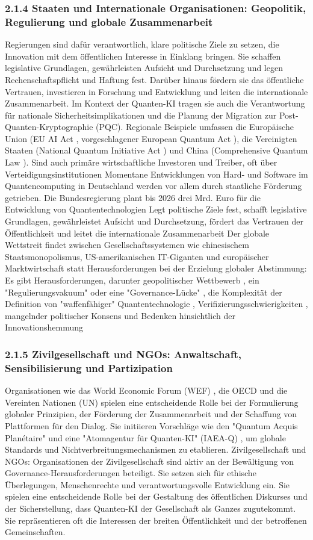 \subsubsection{2.1.4 Staaten und Internationale Organisationen: Geopolitik, Regulierung und globale Zusammenarbeit}
 Regierungen sind dafür verantwortlich, klare politische Ziele zu setzen, die Innovation mit dem öffentlichen Interesse in Einklang bringen. Sie schaffen legislative Grundlagen, gewährleisten Aufsicht und Durchsetzung und legen Rechenschaftspflicht und Haftung fest. Darüber hinaus fördern sie das öffentliche Vertrauen, investieren in Forschung und Entwicklung und leiten die internationale Zusammenarbeit. Im Kontext der Quanten-KI tragen sie auch die Verantwortung für nationale Sicherheitsimplikationen und die Planung der Migration zur Post-Quanten-Kryptographie (PQC). Regionale Beispiele umfassen die Europäische Union (EU AI Act , vorgeschlagener European Quantum Act ), die Vereinigten Staaten (National Quantum Initiative Act ) und China (Comprehensive Quantum Law ). 
Sind auch primäre wirtschaftliche Investoren und Treiber, oft über Verteidigungsinstitutionen
Momentane Entwicklungen von Hard- und Software im Quantencomputing in Deutschland werden vor allem durch staatliche Förderung getrieben. Die Bundesregierung plant bis 2026 drei Mrd. Euro für die Entwicklung von Quantentechnologien
Legt politische Ziele fest, schafft legislative Grundlagen, gewährleistet Aufsicht und Durchsetzung, fördert das Vertrauen der Öffentlichkeit und leitet die internationale Zusammenarbeit
Der globale Wettstreit findet zwischen Gesellschaftssystemen wie chinesischem Staatsmonopolismus, US-amerikanischen IT-Giganten und europäischer Marktwirtschaft statt
Herausforderungen bei der Erzielung globaler Abstimmung: Es gibt Herausforderungen, darunter geopolitischer Wettbewerb , ein "Regulierungsvakuum" oder eine "Governance-Lücke" , die Komplexität der Definition von "waffenfähiger" Quantentechnologie , Verifizierungsschwierigkeiten , mangelnder politischer Konsens und Bedenken hinsichtlich der Innovationshemmung

\subsubsection{2.1.5 Zivilgesellschaft und NGOs: Anwaltschaft, Sensibilisierung und Partizipation}
 Organisationen wie das World Economic Forum (WEF) , die OECD  und die Vereinten Nationen (UN)  spielen eine entscheidende Rolle bei der Formulierung globaler Prinzipien, der Förderung der Zusammenarbeit und der Schaffung von Plattformen für den Dialog. Sie initiieren Vorschläge wie den "Quantum Acquis Planétaire" und eine "Atomagentur für Quanten-KI" (IAEA-Q) , um globale Standards und Nichtverbreitungsmechanismen zu etablieren.
Zivilgesellschaft und NGOs: Organisationen der Zivilgesellschaft sind aktiv an der Bewältigung von Governance-Herausforderungen beteiligt. Sie setzen sich für ethische Überlegungen, Menschenrechte und verantwortungsvolle Entwicklung ein. Sie spielen eine entscheidende Rolle bei der Gestaltung des öffentlichen Diskurses und der Sicherstellung, dass Quanten-KI der Gesellschaft als Ganzes zugutekommt. Sie repräsentieren oft die Interessen der breiten Öffentlichkeit und der betroffenen Gemeinschaften.

